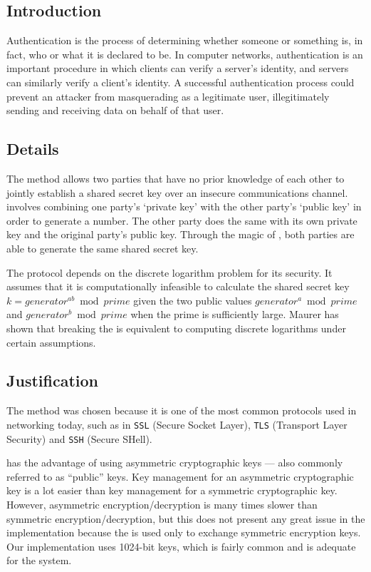 \documentclass[a4paper,11pt]{article}
\begin{document}
\subsection{Introduction}
Authentication is the process of determining whether someone or something is, in
fact, who or what it is declared to be. In computer networks, authentication is
an important procedure in which clients can verify a server's identity, and
servers can similarly verify a client's identity. A successful authentication
process could prevent an attacker from masquerading as a legitimate user,
illegitimately sending and receiving data on behalf of that user.

\subsection{Details}
The  method allows two parties that have
no prior knowledge of each other to jointly establish a shared secret key over
an insecure communications channel. 
involves combining one party's `private key' with the other party's `public key'
in order to generate a number. The other party does the same with its own
private key and the original party's public key. Through the magic of
, both parties are able to generate the same shared
secret key.

The protocol depends on the discrete logarithm problem for its security. It
assumes that it is computationally infeasible to calculate the shared secret key
$k = generator^{ab} \bmod prime$ given the two public values
$generator^{a} \bmod prime$ and $generator^{b} \bmod prime$ when the prime is
sufficiently large. Maurer has shown that breaking the
 is equivalent to computing discrete
logarithms under certain assumptions.

\subsection{Justification}
The  method was chosen because it is one
of the most common protocols used in networking today, such as in \verb+SSL+
(Secure Socket Layer), \verb+TLS+ (Transport Layer Security) and \verb+SSH+
(Secure SHell).

 has the advantage of using asymmetric cryptographic
keys --- also commonly referred to as ``public'' keys. Key management for an
asymmetric cryptographic key is a lot easier than key management for a
symmetric cryptographic key. However, asymmetric encryption/decryption is many
times slower than symmetric encryption/decryption, but this does not present any
great issue in the \packageName{} implementation because the
 is used only to exchange symmetric
encryption keys. Our  implementation uses 1024-bit
keys, which is fairly common and is adequate for the \serviceName{} system.
\end{document}
